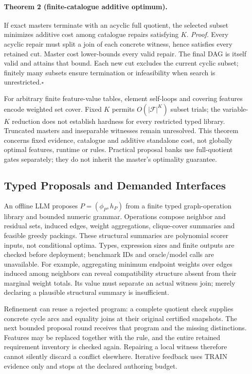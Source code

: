 \paragraph{Theorem 2 (finite-catalogue additive optimum).}
If exact masters terminate with an acyclic full quotient, the selected
subset minimizes additive cost among catalogue repairs satisfying $K$.
\emph{Proof.} Every acyclic repair must split a join of each concrete
witness, hence satisfies every retained cut. Master cost lower-bounds every
valid repair. The final DAG is itself valid and attains that bound. Each
new cut excludes the current cyclic subset; finitely many subsets ensure
termination or infeasibility when search is unrestricted.\hfill$\square$

For arbitrary finite feature-value tables, element self-loops and covering
features encode weighted set cover. Fixed $K$ permits $O(|\mathcal F|^K)$
subset trials; the variable-$K$ reduction does not establish hardness for
every restricted typed library. Truncated masters and inseparable witnesses
remain unresolved. This theorem concerns fixed evidence, catalogue and
additive standalone cost, not globally optimal features, runtime or rules.
Practical proposal banks use full-quotient gates separately; they do not
inherit the master's optimality guarantee.

\subsection{Typed Proposals and Demanded Interfaces}
\label{sec:method:features}
An offline LLM proposes $P=(\phi_P,h_P)$ from a finite typed graph-operation
library and bounded numeric grammar. Operations compose neighbor and residual
sets, induced edges, weight aggregations, clique-cover summaries and feasible
greedy packings. These structural summaries are polynomial scorer inputs,
not conditional optima. Types, expression sizes and finite outputs are checked
before deployment; benchmark IDs and oracle/model calls are unavailable.
For example, aggregating minimum endpoint weights over edges induced among
neighbors can reveal compatibility structure absent from their marginal
weight totals. Its value must separate an actual witness join; merely
declaring a plausible structural summary is insufficient.

Refinement can reuse a rejected program: a complete quotient check supplies
concrete cycle arcs and equality joins at their original certified snapshots.
The next bounded proposal round receives that program and the missing
distinctions. Features may be replaced together with the rule, and the
entire retained requirement inventory is checked again. Repairing a local
witness therefore cannot silently discard a conflict elsewhere. Iterative
feedback uses TRAIN evidence only and stops at the declared authoring budget.

